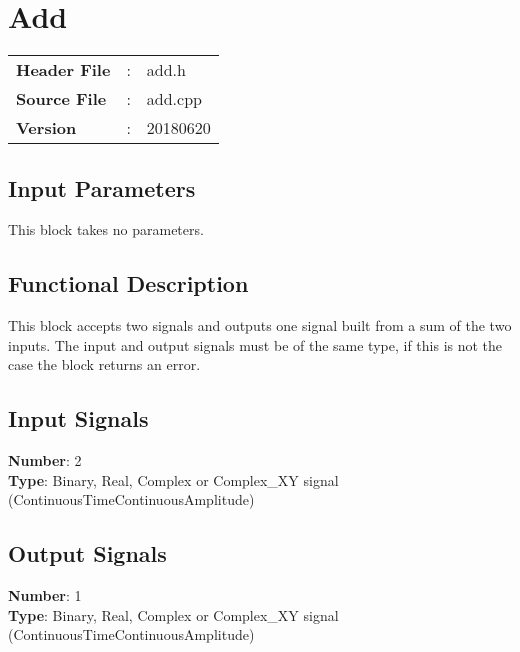 \clearpage

\section{Add}

\begin{tcolorbox}	
\begin{tabular}{p{2.75cm} p{0.2cm} p{10.5cm}} 	
\textbf{Header File}   &:& add.h \\
\textbf{Source File}   &:& add.cpp \\
\textbf{Version}       &:& 20180620
\end{tabular}
\end{tcolorbox}

\subsection*{Input Parameters}

This block takes no parameters.

\subsection*{Functional Description}

This block accepts two signals and outputs one signal built from a sum of the two inputs. The input and output signals must be of the same type, if this is not the case the block returns an error.

\subsection*{Input Signals}

\textbf{Number}: 2\\
\textbf{Type}: Binary, Real, Complex or Complex\_XY signal (ContinuousTimeContinuousAmplitude)

\subsection*{Output Signals}

\textbf{Number}: 1\\
\textbf{Type}: Binary, Real, Complex or Complex\_XY signal (ContinuousTimeContinuousAmplitude)

%
